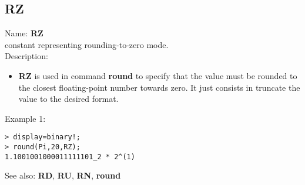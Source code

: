 \subsection{ RZ }
\noindent Name: \textbf{RZ}\\
constant representing rounding-to-zero mode.\\

\noindent Description: \begin{itemize}

\item \textbf{RZ} is used in command \textbf{round} to specify that the value must be rounded
   to the closest floating-point number towards zero. It just consists in 
   truncate the value to the desired format.
\end{itemize}
\noindent Example 1: 
\begin{center}\begin{minipage}{15cm}\begin{Verbatim}[frame=single]
> display=binary!;
> round(Pi,20,RZ);
1.1001001000011111101_2 * 2^(1)
\end{Verbatim}
\end{minipage}\end{center}
See also: \textbf{RD}, \textbf{RU}, \textbf{RN}, \textbf{round}
